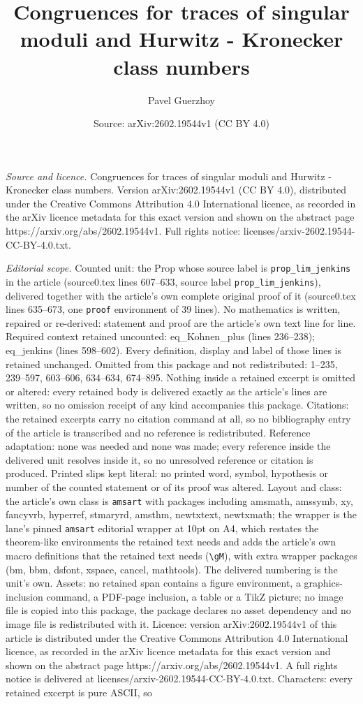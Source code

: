 \documentclass[10pt,a4paper]{amsart}
\title[Congruences for traces of singular moduli and Hurwitz - Kron]{Congruences for traces of singular moduli and Hurwitz - Kronecker class numbers}
\author{Pavel Guerzhoy}
\date{Source: arXiv:2602.19544v1 (CC BY 4.0)}
\begin{document}
\maketitle

\noindent\emph{Source and licence.} Congruences for traces of singular moduli and Hurwitz - Kronecker class numbers. Version arXiv:2602.19544v1 (CC BY 4.0), distributed under the Creative Commons Attribution 4.0 International licence, as recorded in the arXiv licence metadata for this exact version and shown on the abstract page https://arxiv.org/abs/2602.19544v1. Full rights notice: licenses/arxiv-2602.19544-CC-BY-4.0.txt.\par\smallskip

\noindent\textit{Editorial scope.} Counted unit: the Prop whose source label is \texttt{prop\_lim\_jenkins} in the article (source0.tex lines 607--633, source label \texttt{prop\_lim\_jenkins}), delivered together with the article's own complete original proof of it (source0.tex lines 635--673, one \texttt{proof} environment of 39 lines). No mathematics is written, repaired or re-derived: statement and proof are the article's own text line for line. Required context retained uncounted: eq\_Kohnen\_plus (lines 236--238); eq\_jenkins (lines 598--602). Every definition, display and label of those lines is retained unchanged. Omitted from this package and not redistributed: 1--235, 239--597, 603--606, 634--634, 674--895. Nothing inside a retained excerpt is omitted or altered: every retained body is delivered exactly as the article's lines are written, so no omission receipt of any kind accompanies this package. Citations: the retained excerpts carry no citation command at all, so no bibliography entry of the article is transcribed and no reference is redistributed. Reference adaptation: none was needed and none was made; every reference inside the delivered unit resolves inside it, so no unresolved reference or citation is produced. Printed slips kept literal: no printed word, symbol, hypothesis or number of the counted statement or of its proof was altered. Layout and class: the article's own class is \texttt{amsart} with packages including amsmath, amssymb, xy, fancyvrb, hyperref, stmaryrd, amsthm, newtxtext, newtxmath; the wrapper is the lane's pinned \texttt{amsart} editorial wrapper at 10pt on A4, which restates the theorem-like environments the retained text needs and adds the article's own macro definitions that the retained text needs (\texttt{\textbackslash gM}), with extra wrapper packages (bm, bbm, dsfont, xspace, cancel, mathtools). The delivered numbering is the unit's own. Assets: no retained span contains a figure environment, a graphics-inclusion command, a PDF-page inclusion, a table or a TikZ picture; no image file is copied into this package, the package declares no asset dependency and no image file is redistributed with it. Licence: version arXiv:2602.19544v1 of this article is distributed under the Creative Commons Attribution 4.0 International licence, as recorded in the arXiv licence metadata for this exact version and shown on the abstract page https://arxiv.org/abs/2602.19544v1. A full rights notice is delivered at licenses/arxiv-2602.19544-CC-BY-4.0.txt. Characters: every retained excerpt is pure ASCII, so 
\end{document}

